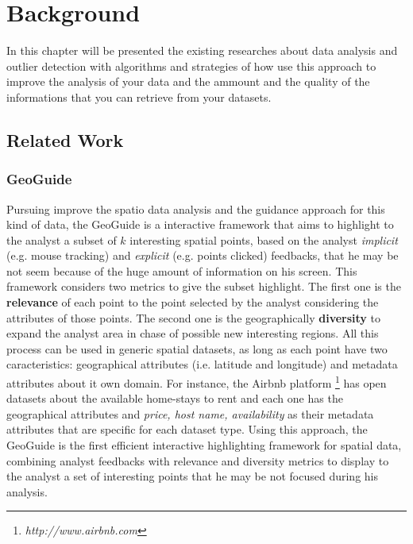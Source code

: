 \chapter{Background}


In this chapter will be presented the existing researches about data analysis and
outlier detection with algorithms and strategies of how use this approach to improve
the analysis of your data and the ammount and the quality of the informations that
you can retrieve from your datasets.

\section{Related Work}

\subsection{GeoGuide}


Pursuing improve the spatio data analysis and the guidance approach for this kind of
data, the GeoGuide \cite{omidvarTehrani2017} is a interactive framework that aims to
highlight to the analyst a subset of $k$ interesting spatial points, based on the analyst 
\textit{implicit} (e.g. mouse tracking) and \textit{explicit} (e.g. points clicked) 
feedbacks, that he may be not seem because of the huge amount of information on his 
screen. This framework considers two metrics to give the subset highlight. The first 
one is the \textbf{relevance} of each point to the point selected by the analyst 
considering the attributes of those points. The second one is the geographically 
\textbf{diversity} to expand the analyst area in chase of possible new interesting 
regions. All this process can be used in generic spatial datasets, as long as each 
point have two caracteristics: geographical attributes (i.e. latitude and longitude) 
and metadata attributes about it own domain. For instance, the Airbnb platform 
\footnote{\it http://www.airbnb.com} has open datasets about the available home-stays 
to rent and each one has the geographical attributes and \textit{price, host name, 
availability} as their metadata attributes that are specific for each dataset type. 
Using this approach, the GeoGuide is the first efficient interactive highlighting 
framework for spatial data, combining analyst feedbacks with relevance and diversity 
metrics to display to the analyst a set of interesting points that he may be not 
focused during his analysis.

